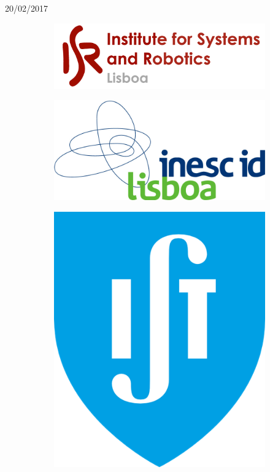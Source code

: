\begin{titlepage}


{\large 20/02/2017}\\[1cm] %




\begin{figure}
\centering
\begin{subfigure}{.5\textwidth}
  \centering
  \includegraphics[width=.5\linewidth]{isr-logo.png}
\end{subfigure}%
\begin{subfigure}{.5\textwidth}
  \centering
  \includegraphics[width=.5\linewidth]{inesc-id-logo.png}
\end{subfigure}
\begin{subfigure}{.5\textwidth}
  \centering
  \includegraphics[width=.25\linewidth]{ist-logo.png}
\end{subfigure}
\end{figure}
 

\vfill %

\end{titlepage}

